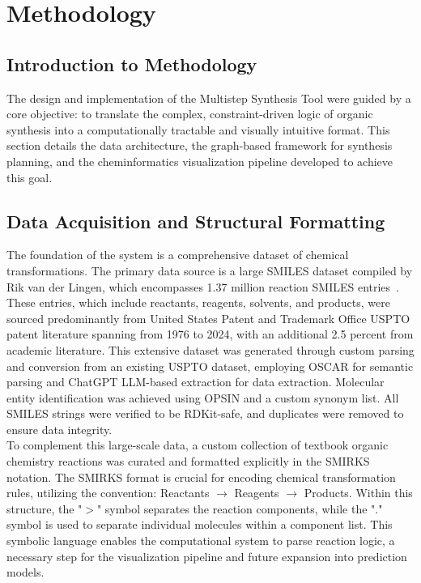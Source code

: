 \documentclass[12pt]{article}
\begin{document}
\section{Methodology}
\subsection{Introduction to Methodology}
The design and implementation of the Multistep Synthesis Tool were guided by a core objective: to translate the complex, constraint-driven logic of organic synthesis into a computationally tractable and visually intuitive format.
This section details the data architecture, the graph-based framework for synthesis planning, and the cheminformatics visualization pipeline developed to achieve this goal.
\subsection{Data Acquisition and Structural Formatting}
The foundation of the system is a comprehensive dataset of chemical transformations.
The primary data source is a large SMILES dataset compiled by Rik van der Lingen, which encompasses 1.37 million reaction SMILES entries~\cite{vanderlingen2025reaction}.
These entries, which include reactants, reagents, solvents, and products, were sourced predominantly from United States Patent and Trademark Office USPTO patent literature spanning from 1976 to 2024, with an additional 2.5 percent from academic literature.
This extensive dataset was generated through custom parsing and conversion from an existing USPTO dataset, employing OSCAR for semantic parsing and ChatGPT LLM-based extraction for data extraction.
Molecular entity identification was achieved using OPSIN and a custom synonym list.
All SMILES strings were verified to be RDKit-safe, and duplicates were removed to ensure data integrity.
\\
To complement this large-scale data, a custom collection of textbook organic chemistry reactions was curated and formatted explicitly in the SMIRKS notation.
The SMIRKS format is crucial for encoding chemical transformation rules, utilizing the convention: {Reactants $\rightarrow$ Reagents $\rightarrow$ Products}.
Within this structure, the "$>$" symbol separates the reaction components, while the "$.$" symbol is used to separate individual molecules within a component list.
This symbolic language enables the computational system to parse reaction logic, a necessary step for the visualization pipeline and future expansion into prediction models.
\end{document}
